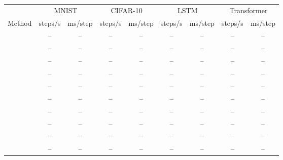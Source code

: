 \begin{tabular}{l cc cc cc cc}
\toprule
 & \multicolumn{2}{c}{MNIST} & \multicolumn{2}{c}{CIFAR-10} & \multicolumn{2}{c}{LSTM} & \multicolumn{2}{c}{Transformer} \\
\cmidrule(lr){2-3}\cmidrule(lr){4-5}\cmidrule(lr){6-7}\cmidrule(lr){8-9}
Method & steps/s & ms/step & steps/s & ms/step & steps/s & ms/step & steps/s & ms/step \\
\midrule
\BP{} & -- & -- & -- & -- & -- & -- & -- & -- \\
\SPSA{} & -- & -- & -- & -- & -- & -- & -- & -- \\
\SPSAb{} & -- & -- & -- & -- & -- & -- & -- & -- \\
\RS{} & -- & -- & -- & -- & -- & -- & -- & -- \\
\NP{} & -- & -- & -- & -- & -- & -- & -- & -- \\
\ANP{} & -- & -- & -- & -- & -- & -- & -- & -- \\
\ANPb{} & -- & -- & -- & -- & -- & -- & -- & -- \\
\INP{} & -- & -- & -- & -- & -- & -- & -- & -- \\
\DANP{} & -- & -- & -- & -- & -- & -- & -- & -- \\
\FF{} & -- & -- & -- & -- & -- & -- & -- & -- \\
\bottomrule
\end{tabular}
